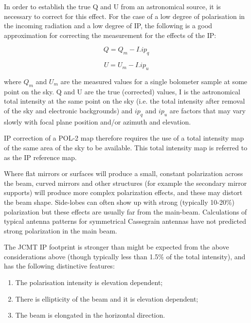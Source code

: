 In order to establish the true Q and U from an astronomical source, it is necessary to correct
for this effect. For the case of a low degree of polarisation in the incoming radiation and a low
degree of IP, the following is a good approximation for correcting the measurement for the effects of the IP:

\begin{equation}
Q = Q_{m} - I. ip_{q}
\end{equation}

\begin{equation}
U = U_{m} - I. ip_{u}
\end{equation}

where $Q_{m}$ and $U_{m}$ are the measured values for a single bolometer sample at
some point on the sky. Q and U are the true (corrected) values, I is the astronomical
total intensity at the same point on the sky (i.e. the total intensity after removal of
the sky and electronic backgrounds) and $ip_{q}$  and $ip_{u}$  are factors that may vary
slowly with focal plane position and/or azimuth and elevation.

IP correction of a POL-2 map therefore requires the use of a total intensity map of the same area
of the sky to be available. This total intensity map is referred to as the IP reference map.

Where flat mirrors or surfaces will produce a small, constant polarization across the beam,
curved mirrors and other structures (for example the secondary mirror supports) will
produce more complex polarization effects, and these may distort the beam shape.
Side-lobes can often show up with strong (typically 10-20\%) polarization but these
effects are usually far from the main-beam. Calculations of typical antenna patterns
for symmetrical Cassegrain antennas have not predicted strong polarization in the main beam.

The JCMT IP footprint is stronger than might be expected from the above considerations above (though typically less than 1.5\% of
the total intensity), and has the following distinctive features:

\begin{enumerate}\itemsep-0.2em
\item The polarisation intensity is elevation dependent;
\item There is ellipticity of the beam and it is elevation dependent;
\item The beam is elongated in the horizontal direction.
\end{enumerate}

